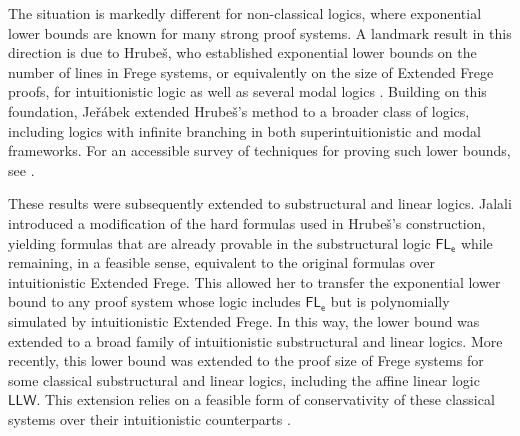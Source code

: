 \documentclass[12pt,a4paper]{article}
\theoremstyle{plain}
\theoremstyle{definition}
\begin{document}
The situation is markedly different for non-classical logics, where exponential lower bounds are known for many strong proof systems. A landmark result in this direction is due to Hrubeš, who established exponential lower bounds on the number of lines in Frege systems, or equivalently on the size of Extended Frege proofs, for intuitionistic logic as well as several modal logics \cite{Hrubes1,Hrubes,Hrubes2}. Building on this foundation, Jeřábek \cite{jerabek} extended Hrubeš's method to a broader class of logics, including logics with infinite branching in both superintuitionistic and modal frameworks. For an accessible survey of techniques for proving such lower bounds, see \cite{AmirProofComp}.

These results were subsequently extended to substructural and linear logics. Jalali \cite{Raheleh} introduced a modification of the hard formulas used in Hrubeš's construction, yielding formulas that are already provable in the substructural logic $\mathsf{FL_e}$ while remaining, in a feasible sense, equivalent to the original formulas over intuitionistic Extended Frege. This allowed her to transfer the exponential lower bound to any proof system whose logic includes $\mathsf{FL_e}$ but is polynomially simulated by intuitionistic Extended Frege. In this way, the lower bound was extended to a broad family of intuitionistic substructural and linear logics. More recently, this lower bound was extended to the proof size of Frege systems for some classical substructural and linear logics, including the affine linear logic $\mathsf{LLW}$. This extension relies on a feasible form of conservativity of these classical systems over their intuitionistic counterparts \cite{tabatabai2026proof}.
\end{document}
